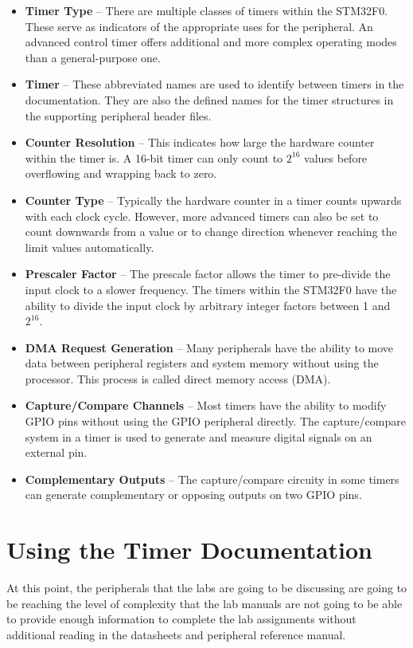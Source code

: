\documentclass[11pt,fleqn]{book} %
\begin{document}
        \begin{itemize}
            \item \textbf{Timer Type} -- There are multiple classes of timers within the STM32F0. These serve as indicators of the appropriate uses for the peripheral. An advanced control timer offers additional and more complex operating modes than a general-purpose one. 
            \item \textbf{Timer} -- These abbreviated names are used to identify between timers in the documentation. They are also the defined names for the timer structures in the supporting peripheral header files. 
            \item \textbf{Counter Resolution} -- This indicates how large the hardware counter within the timer is. A 16-bit timer can only count to $2^{16}$ values before overflowing and wrapping back to zero. 
            \item \textbf{Counter Type} -- Typically the hardware counter in a timer counts upwards with each clock cycle. However, more advanced timers can also be set to count downwards from a value or to change direction whenever reaching the limit values automatically. 
            \item \textbf{Prescaler Factor} -- The prescale factor allows the timer to pre-divide the input clock to a slower frequency. The timers within the STM32F0 have the ability to divide the input clock by arbitrary integer factors between 1 and $2^{16}$.
            \item \textbf{DMA Request Generation} -- Many peripherals have the ability to move data between peripheral registers and system memory without using the processor. This process is called direct memory access (DMA).
            \item \textbf{Capture/Compare Channels} -- Most timers have the ability to modify GPIO pins without using the GPIO peripheral directly. The capture/compare system in a timer is used to generate and measure digital signals on an external pin. 
            \item \textbf{Complementary Outputs} -- The capture/compare circuity in some timers can generate complementary or opposing outputs on two GPIO pins. 
        \end{itemize}

\section{Using the Timer Documentation}
    At this point, the peripherals that the labs are going to be discussing are going to be reaching the level of complexity that the lab manuals are not going to be able to provide enough information to complete the lab assignments without additional reading in the datasheets and peripheral reference manual. 
    
\end{document}
